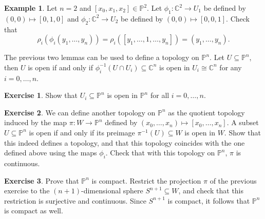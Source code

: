 \documentclass{article}
\newcommand{\C}{\mathbb{C}}
\renewcommand{\P}{\mathbb{P}}
\newcommand{\rb}[1]{\left( #1 \right)}
\renewcommand{\sb}[1]{\left[ #1 \right]}
\theoremstyle{definition}\newtheorem{definition}{Definition}[section]
\theoremstyle{definition}\newtheorem{notation}[definition]{Notation}
\theoremstyle{definition}\newtheorem{remark}[definition]{Remark}
\theoremstyle{definition}\newtheorem{example}[definition]{Example}
\theoremstyle{definition}\newtheorem{fact}{Fact}
\theoremstyle{definition}\newtheorem{exercise}{Exercise}
\begin{document}
\begin{example}
Let $ n = 2 $ and $ \sb{x_0, x_1, x_2} \in \P^2 $. Let $ \phi_1 : \C^2 \to U_1 $ be defined by $ \rb{0, 0} \mapsto \sb{0, 1, 0} $ and $ \phi_2 : \C^2 \to U_2 $ be defined by $ \rb{0, 0} \mapsto \sb{0, 0, 1} $. Check that
$$ \rho_i\rb{\phi_i\rb{y_1, \dots, y_n}} = \rho_i\rb{\sb{y_1, \dots, 1, \dots, y_n}} = \rb{y_1, \dots, y_n}. $$
\end{example}

The previous two lemmas can be used to define a topology on $ \P^n $. Let $ U \subseteq \P^n $, then $ U $ is open if and only if $ \phi_i^{-1}\rb{U \cap U_i} \subseteq \C^n $ is open in $ U_i \cong \C^n $ for any $ i = 0, \dots, n $.

\begin{exercise}
Show that $ U_i \subseteq \P^n $ is open in $ \P^n $ for all $ i = 0, \dots, n $.
\end{exercise}

\begin{exercise}
We can define another topology on $ \P^n $ as the quotient topology induced by the map $ \pi : W \to \P^n $ defined by $ \rb{x_0, \dots, x_n} \mapsto \sb{x_0, \dots, x_n} $. A subset $ U \subseteq \P^n $ is open if and only if its preimage $ \pi^{-1}\rb{U} \subseteq W $ is open in $ W $. Show that this indeed defines a topology, and that this topology coincides with the one defined above using the maps $ \phi_i $. Check that with this topology on $ \P^n $, $ \pi $ is continuous.
\end{exercise}

\begin{exercise}
\label{ex:12}
Prove that $ \P^n $ is compact. Restrict the projection $ \pi $ of the previous exercise to the $ \rb{n + 1} $-dimensional sphere $ S^{n + 1} \subseteq W $, and check that this restriction is surjective and continuous. Since $ S^{n + 1} $ is compact, it follows that $ \P^n $ is compact as well.
\end{exercise}
\end{document}
